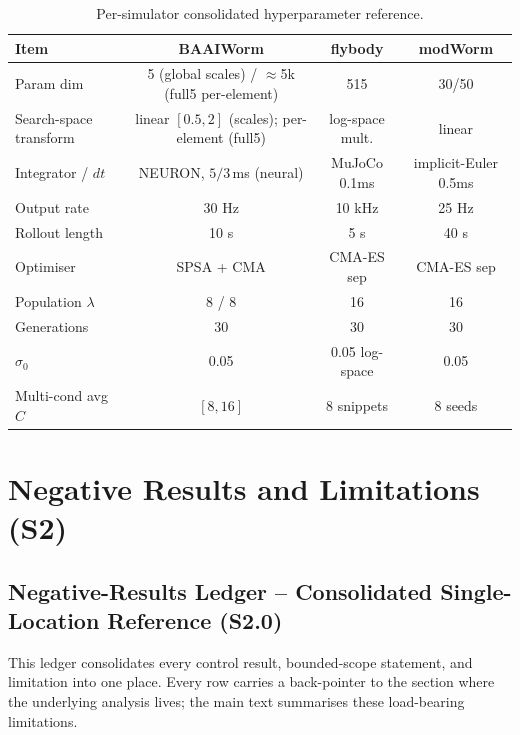 \documentclass[11pt]{article}
\begin{document}
\begin{table}[H]\centering\small
\begin{tabular}{lccc}\toprule
Item & BAAIWorm & flybody & modWorm \\\midrule
Param dim & 5 (global scales) / $\approx$5k (full5 per-element) & 515 & 30/50 \\
Search-space transform & linear $[0.5,2]$ (scales); per-element (full5) & log-space mult. & linear \\
Integrator / $dt$ & NEURON, $5/3$\,ms (neural) & MuJoCo 0.1ms & implicit-Euler 0.5ms \\
Output rate & 30 Hz & 10 kHz & 25 Hz \\
Rollout length & 10 s & 5 s & 40 s \\
Optimiser & SPSA + CMA & CMA-ES sep & CMA-ES sep \\
Population $\lambda$ & 8 / 8 & 16 & 16 \\
Generations & 30 & 30 & 30 \\
$\sigma_0$ & 0.05 & 0.05 log-space & 0.05 \\
Multi-cond avg $C$ & $[8,16]$ & 8 snippets & 8 seeds \\
\bottomrule
\end{tabular}
\caption{Per-simulator consolidated hyperparameter reference.}
\end{table}

\section{Negative Results and Limitations (S2)}
\label{si:negatives}

\subsection{Negative-Results Ledger -- Consolidated Single-Location Reference (S2.0)}
\noindent This ledger consolidates every control result, bounded-scope statement, and limitation into one place. Every row carries a back-pointer to the section where the underlying analysis lives; the main text summarises these load-bearing limitations.
\end{document}
